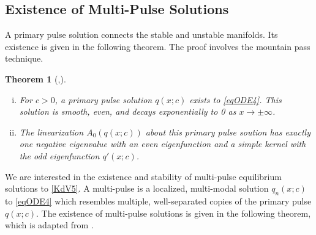 \documentclass[12pt]{article}
\newtheorem{theorem}{Theorem}
\begin{document}
\subsection{Existence of Multi-Pulse Solutions}

A primary pulse solution connects the stable and unstable manifolds. Its existence is given in the following theorem. The proof involves the mountain pass technique.


\begin{theorem}[\cite{Groves1998},\cite{Pelinovsky2007}]\label{singleexist}
\[\]
\begin{enumerate}[(i)]
\item For $c>0$, a primary pulse solution $q(x; c)$ exists to \eqref{eqODE4}. This solution is smooth, even, and decays exponentially to 0 as $x \rightarrow \pm \infty$.
\item The linearization $A_0(q(x; c))$ about this primary pulse soution has exactly one negative eigenvalue with an even eigenfunction and a simple kernel with the odd eigenfunction $q'(x; c)$.
\end{enumerate}
\end{theorem}

We are interested in the existence and stability of multi-pulse equilibrium solutions to \eqref{KdV5}. A multi-pulse is a localized, multi-modal solution $q_n(x; c)$ to \eqref{eqODE4} which resembles multiple, well-separated copies of the primary pulse $q(x; c)$. The existence of multi-pulse solutions is given in the following theorem, which is adapted from \cite{Sandstede1997}.

\end{document}
